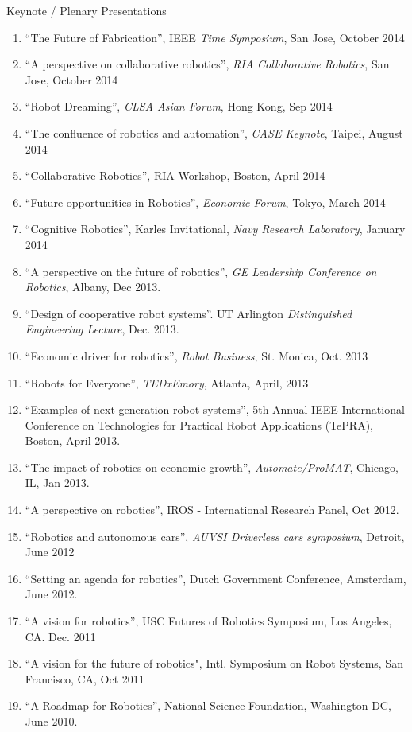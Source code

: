 \documentclass{article}
\begin{document}
\begin{cv}
\begin{cvlist}{Keynote / Plenary Presentations}
\begin{enumerate}
  \item ``The Future of Fabrication'', IEEE {\em Time Symposium}, San Jose, October 2014
  \item ``A perspective on collaborative robotics'', {\em RIA Collaborative Robotics}, San Jose, October 2014
  \item ``Robot Dreaming'', {\em CLSA Asian Forum}, Hong Kong, Sep 2014
  \item ``The confluence of robotics and automation'', {\em CASE Keynote}, Taipei, August 2014
  \item ``Collaborative Robotics'', RIA Workshop, Boston, April 2014
  \item ``Future opportunities in Robotics'', {\em Economic Forum}, Tokyo, March 2014
  \item ``Cognitive Robotics'', Karles Invitational, {\em Navy Research Laboratory}, January 2014
  \item ``A perspective on the future of robotics'', {\em GE Leadership Conference on Robotics}, Albany, Dec 2013.
  \item ``Design of cooperative robot systems''. UT Arlington {\em Distinguished Engineering Lecture}, Dec. 2013.
  \item ``Economic driver for robotics'', {\em Robot Business}, St. Monica,  Oct. 2013
  \item ``Robots for Everyone'', {\em TEDxEmory}, Atlanta, April, 2013
  \item ``Examples of next generation robot systems'', 5th Annual IEEE
    International Conference on Technologies for Practical Robot
    Applications (TePRA), Boston, April 2013.
  \item ``The impact of robotics on economic growth'', {\em Automate/ProMAT}, Chicago, IL, Jan 2013.
  \item ``A perspective on robotics'', IROS - International Research  Panel, Oct 2012.
  \item ``Robotics and autonomous cars'', {\em AUVSI Driverless cars symposium}, Detroit, June 2012
  \item ``Setting an agenda for robotics'', Dutch Government  Conference, Amsterdam, June 2012.
  \item ``A vision for robotics'', USC Futures of Robotics Symposium, Los Angeles, CA.  Dec. 2011
  \item ``A vision for the future of robotics", Intl. Symposium on Robot Systems, San Francisco, CA, Oct 2011
  \item ``A Roadmap for Robotics'', National Science Foundation,  Washington DC, June 2010.

\end{enumerate}
\end{cvlist}
\end{cv}
\end{document}
